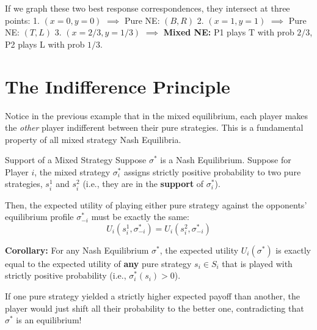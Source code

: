 \documentclass[12pt, a4paper]{article}
\begin{document}
If we graph these two best response correspondences, they intersect at three points:
1. $(x=0, y=0)$ $\implies$ Pure NE: $(B, R)$
2. $(x=1, y=1)$ $\implies$ Pure NE: $(T, L)$
3. $(x=2/3, y=1/3)$ $\implies$ \textbf{Mixed NE:} P1 plays T with prob $2/3$, P2 plays L with prob $1/3$.

\section{The Indifference Principle}

Notice in the previous example that in the mixed equilibrium, each player makes the \textit{other} player indifferent between their pure strategies. This is a fundamental property of all mixed strategy Nash Equilibria.

\begin{thmbox}{Support of a Mixed Strategy}
  Suppose $\sigma^*$ is a Nash Equilibrium. Suppose for Player $i$, the mixed strategy $\sigma_i^*$ assigns strictly positive probability to two pure strategies, $s_i^1$ and $s_i^2$ (i.e., they are in the \textbf{support} of $\sigma_i^*$).
  
  Then, the expected utility of playing either pure strategy against the opponents' equilibrium profile $\sigma_{-i}^*$ must be exactly the same:
  \[
    U_i(s_i^1, \sigma_{-i}^*) = U_i(s_i^2, \sigma_{-i}^*)
  \]
\end{thmbox}

\begin{notebox}
  \textbf{Corollary:} For any Nash Equilibrium $\sigma^*$, the expected utility $U_i(\sigma^*)$ is exactly equal to the expected utility of \textbf{any} pure strategy $s_i \in S_i$ that is played with strictly positive probability (i.e., $\sigma_i^*(s_i) > 0$).
  
  If one pure strategy yielded a strictly higher expected payoff than another, the player would just shift all their probability to the better one, contradicting that $\sigma^*$ is an equilibrium!
\end{notebox}
\end{document}
